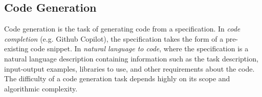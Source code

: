 




\vspace{-0.25cm}

\subsection{Code Generation}

\vspace{-0.1cm}

Code generation is the task of generating code from a specification. In \textit{code completion} (e.g. Github Copilot), the specification takes the form of a pre-existing code snippet. In \textit{natural language to code}, where the specification is a natural language description containing information such as the task description, input-output examples, libraries to use, and other requirements about the code. The difficulty of a code generation task depends highly on its scope and algorithmic complexity.

